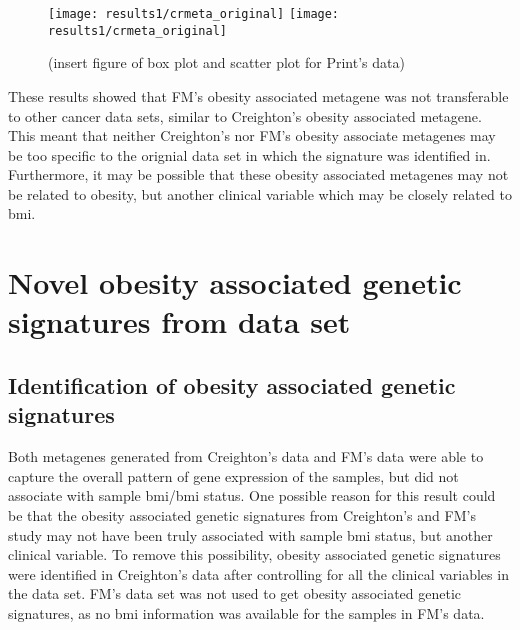 \begin{figure}[htp!]
	\centering
	\texttt{[image: results1/crmeta\_original]}
	\hfill
	\texttt{[image: results1/crmeta\_original]}
	\caption[FM metagene and sample \gls{bmi}/\gls{bmi} status in Print's data]{(insert figure of box plot and scatter plot for Print's data)}
	\label{fig:fmmetaboxcris1}
\end{figure}

\noindent
These results showed that FM's obesity associated metagene was not transferable to other cancer data sets, similar to Creighton's obesity associated metagene.
This meant that neither Creighton's nor FM's obesity associate metagenes may be too specific to the orignial data set in which the signature was identified in.
Furthermore, it may be possible that these obesity associated metagenes may not be related to obesity, but another clinical variable which may be closely related to \gls{bmi}.

\section{Novel obesity associated genetic signatures from \citet{Creighton2012} data set}
\label{sec:creighton_obesity_metagene_new}

\subsection{Identification of obesity associated genetic signatures}
\label{sub:identification_of_obesity_associated_genetic_signatures}

Both metagenes generated from Creighton's data and FM's data were able to capture the overall pattern of gene expression of the samples, but did not associate with sample \gls{bmi}/\gls{bmi} status.
One possible reason for this result could be that the obesity associated genetic signatures from Creighton's and FM's study may not have been truly associated with sample \gls{bmi} status, but another clinical variable.
To remove this possibility, obesity associated genetic signatures were identified in Creighton's data after controlling for all the clinical variables in the data set.
FM's data set was not used to get obesity associated genetic signatures, as no \gls{bmi} information was available for the samples in FM's data.

